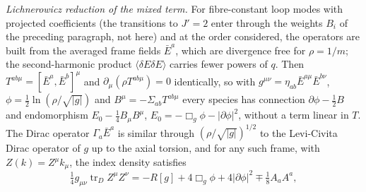 \emph{Lichnerowicz reduction of the mixed term.} For fibre-constant loop modes with projected coefficients (the transitions to \(J'=2\) enter through the weights \(B_i\) of the preceding paragraph, not here) and at the order considered, the operators are built from the averaged frame fields \(\bar E^a\), which are divergence free for \(\rho=1/m\); the second-harmonic product \(\langle\delta E\delta E\rangle\) carries fewer powers of \(q\). Then \(T^{ab\mu}=[\bar E^a,\bar E^b]^\mu\) and \(\partial_\mu(\rho T^{ab\mu})=0\) identically, so with \(g^{\mu\nu}=\eta_{ab}\bar E^{a\mu}\bar E^{b\nu}\), \(\phi=\tfrac12\ln(\rho/\sqrt{|g|})\) and \(B^\mu=-\Sigma_{ab}T^{ab\mu}\) every species has connection \(\partial\phi-\tfrac12B\) and endomorphism \(E_0-\tfrac14B_\mu B^\mu\), \(E_0=-\Box_g\phi-|\partial\phi|^2\), without a term linear in \(T\). The Dirac operator \(\Gamma_a\bar E^a\) is similar through \((\rho/\sqrt{|g|})^{1/2}\) to the Levi-Civita Dirac operator of \(g\) up to the axial torsion, and for any such frame, with \(Z(k)=Z^\mu k_\mu\), the index density satisfies
\[
\tfrac14g_{\mu\nu}\operatorname{tr}_DZ^\mu Z^\nu=-R[g]+4\Box_g\phi+4|\partial\phi|^2\mp\tfrac18A_aA^a,
\]
